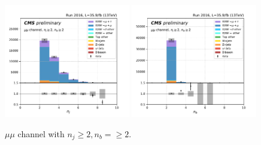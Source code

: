 \begin{figure}[ht]
    \includegraphics[width=0.49\textwidth]{chapters/Appendix/sectionPlots/figures/kinematics_pickles/mumu/2b/mumu_2b_nJets.pdf}
    \includegraphics[width=0.49\textwidth]{chapters/Appendix/sectionPlots/figures/kinematics_pickles/mumu/2b/mumu_2b_nBJets.pdf}
    
    \caption{$\mu\mu$ channel with $n_j\geq2, n_b=\geq2$.}
\end{figure}


